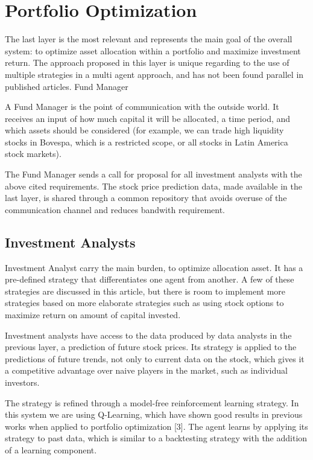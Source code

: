 \documentclass[prodmode,acmtecs]{acmsmall} %
\begin{document}
\section {Portfolio Optimization}

The last layer is the most relevant and represents the main goal of the overall system: to optimize asset allocation within a portfolio and maximize investment return. The approach proposed in this layer is unique regarding to the use of multiple strategies in a multi agent approach, and has not been found parallel in published articles. 
Fund Manager

A Fund Manager is the point of communication with the outside world. It receives an input of how much capital it will be allocated, a time period, and which assets should be considered (for example, we can trade high liquidity stocks in Bovespa, which is a restricted scope, or all stocks in Latin America stock markets).

The Fund Manager sends a call for proposal for all investment analysts with the above cited requirements. The stock price prediction data, made available in the last layer, is shared through a common repository that avoids overuse of the communication channel and reduces bandwith requirement. 

\subsection {Investment Analysts}

Investment Analyst carry the main burden, to optimize allocation asset. It has a pre-defined strategy that differentiates one agent from another. A few of these strategies are discussed in this article, but there is room to implement more strategies based on more elaborate strategies such as using stock options to maximize return on amount of capital invested. 

Investment analysts have access to the data produced by data analysts in the previous layer, a prediction of future stock prices. Its strategy is applied to the predictions of future trends, not only to current data on the stock, which gives it a competitive advantage over naive players in the market, such as individual investors.  

The strategy is refined through a model-free reinforcement learning strategy. In this system we are using Q-Learning, which have shown good results in previous works when applied to portfolio optimization [3]. The agent learns by applying its strategy to past data, which is similar to a backtesting strategy with the addition of a learning component. 
\end{document}
